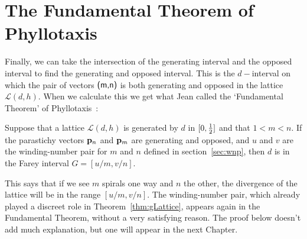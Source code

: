 \section{The Fundamental Theorem of Phyllotaxis}
\label{sec:ftp}
Finally, we can take the intersection of the generating interval and the opposed interval to find the generating and opposed interval. This is the $d-$interval on which the pair of vectors $\textsf{(m,n)}$ is both generating and opposed in the lattice $\mathcal{L}(d,h)$.
When we calculate this we get what Jean called the `Fundamental Theorem' of Phyllotaxis~\autocite{jeanPhyllotaxisSystemicStudy1994}:
\begin{theorem}  
	\label{thm:fundamentalcorresponding}
	Suppose that a lattice $\mathcal{L}(d,h)$ is generated by  $d$ in $[0,\textstyle{\frac{1}{2}}]$ and that $1<m<n$. 
	If the parastichy vectors ${\mathbf p}_{n}$ and ${\mathbf p}_{m}$ are generating and opposed,
	and $u$ and $v$ are the winding-number pair for  $m$ and $n$ defined in section~\ref{sec:wnp}, then $d$ is in the Farey interval $G=[u/m,v/n]$.
\end{theorem}
This says that if we see $m$ spirals one way and $n$ the other, the divergence of the lattice will be in the range $[u/m,v/n]$. The  winding-number pair, which already played a discreet role in Theorem~\ref{thm:gLattice}, appears again in the Fundamental Theorem, without a very satisfying reason. The proof below doesn't add much explanation, but one will appear in the next Chapter.

